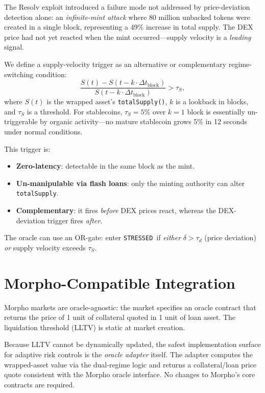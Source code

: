 \documentclass[11pt]{article}
\newcommand{\STRESSED}{\texttt{STRESSED}}
\begin{document}
The Resolv exploit introduced a failure mode not addressed by price-deviation detection alone: an \emph{infinite-mint attack} where 80 million unbacked tokens were created in a single block, representing a 49\% increase in total supply. The DEX price had not yet reacted when the mint occurred---supply velocity is a \emph{leading} signal.

We define a supply-velocity trigger as an alternative or complementary regime-switching condition:
\[
\frac{S(t) - S(t - k\cdot\Delta t_{\text{block}})}{S(t - k\cdot\Delta t_{\text{block}})} > \tau_S,
\]
where $S(t)$ is the wrapped asset's \texttt{totalSupply()}, $k$ is a lookback in blocks, and $\tau_S$ is a threshold. For stablecoins, $\tau_S = 5\%$ over $k=1$ block is essentially un-triggerable by organic activity---no mature stablecoin grows 5\% in 12 seconds under normal conditions.

This trigger is:
\begin{itemize}[leftmargin=*]
\item \textbf{Zero-latency}: detectable in the same block as the mint.
\item \textbf{Un-manipulable via flash loans}: only the minting authority can alter \texttt{totalSupply}.
\item \textbf{Complementary}: it fires \emph{before} DEX prices react, whereas the DEX-deviation trigger fires \emph{after}.
\end{itemize}

The oracle can use an OR-gate: enter \STRESSED\ if \emph{either} $\delta > \tau_d$ (price deviation) \emph{or} supply velocity exceeds $\tau_S$.

\section{Morpho-Compatible Integration}
\label{sec:morpho}

Morpho markets are oracle-agnostic: the market specifies an oracle contract that returns the price of 1 unit of collateral quoted in 1 unit of loan asset. The liquidation threshold (LLTV) is static at market creation.

Because LLTV cannot be dynamically updated, the safest implementation surface for adaptive risk controls is the \emph{oracle adapter} itself. The adapter computes the wrapped-asset value via the dual-regime logic and returns a collateral/loan price quote consistent with the Morpho oracle interface. No changes to Morpho's core contracts are required.
\end{document}
